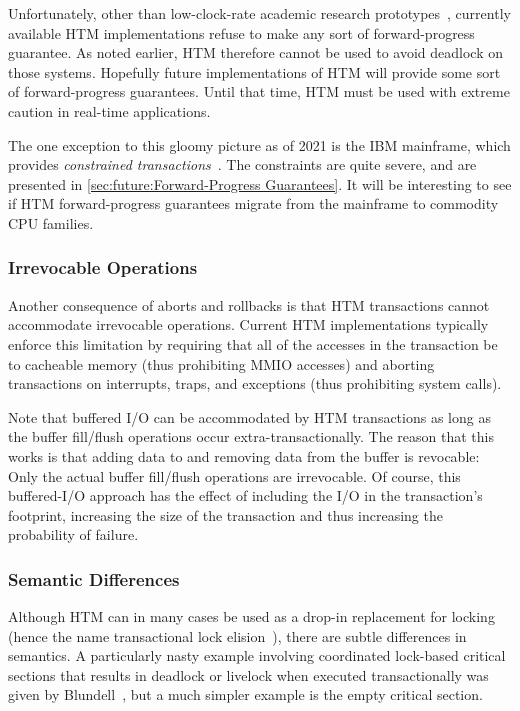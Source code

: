 Unfortunately, other than low-clock-rate academic research
prototypes~\cite{MartinSchoeberl2010realtimeTM},
currently available HTM implementations refuse to make any
sort of forward-progress guarantee.
As noted earlier, HTM therefore cannot be used to avoid deadlock on
those systems.
Hopefully future implementations of HTM will provide some sort of
forward-progress guarantees.
Until that time, HTM must be used with extreme caution in real-time
applications.

The one exception to this gloomy picture as of 2021 is
the IBM mainframe, which provides
\emph{constrained transactions}~\cite{ChristianJacobi2012MainframeTM}.
The constraints are quite severe, and are presented in
\cref{sec:future:Forward-Progress Guarantees}.
It will be interesting to see if HTM forward-progress guarantees migrate
from the mainframe to commodity CPU families.

\subsubsection{Irrevocable Operations}
\label{sec:future:Irrevocable Operations}

Another consequence of aborts and rollbacks is that HTM transactions
cannot accommodate irrevocable operations.
Current HTM implementations typically enforce this limitation by
requiring that all of the accesses in the transaction be to cacheable
memory (thus prohibiting MMIO accesses) and aborting transactions on
interrupts, traps, and exceptions (thus prohibiting system calls).

Note that buffered I/O can be accommodated by HTM transactions as
long as the buffer fill/flush operations occur extra-transactionally.
The reason that this works is that adding data to and removing data
from the buffer is revocable: Only the actual buffer fill/flush
operations are irrevocable.
Of course, this buffered-I/O approach has the effect of including the I/O
in the transaction's footprint, increasing the size of the transaction
and thus increasing the probability of failure.

\subsubsection{Semantic Differences}
\label{sec:future:Semantic Differences}

Although HTM can in many cases be used as a drop-in replacement for locking
(hence the name transactional lock
elision~\cite{DaveDice2008TransactLockElision}),
there are subtle differences in semantics.
A particularly nasty example involving coordinated lock-based critical
sections that results in deadlock or livelock when executed transactionally
was given by Blundell~\cite{Blundell2006TMdeadlock}, but a much simpler
example is the empty critical section.

